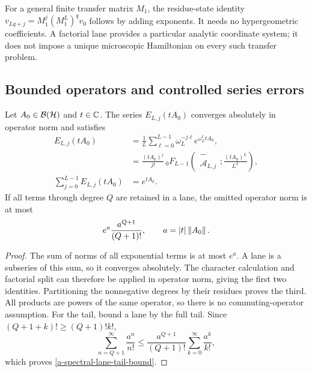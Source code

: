 For a general finite transfer matrix $M_1$, the residue-state identity
$v_{Lq+j}=M_1^j(M_1^L)^qv_0$ follows by adding exponents. It needs
no hypergeometric coefficients. A factorial lane provides a particular
analytic coordinate system; it does not impose a unique microscopic
Hamiltonian on every such transfer problem.

\subsection{Bounded operators and controlled series errors}

\begin{theorem}
\label{a-spectral-bounded-operator-lanes}
Let $A_0\in\mathcal B(\mathcal H)$ and $t\in\mathbb C$. The series
$E_{L,j}(tA_0)$ converges absolutely in operator norm and satisfies
\begin{align}
 E_{L,j}(tA_0)
 &=\frac1L\sum_{\ell=0}^{L-1}\omega_L^{-j\ell}
                           e^{\omega_L^\ell tA_0},\nonumber\\
 &=\frac{(tA_0)^j}{j!}\,
 {}_0F_{L-1}\!\left(\begin{matrix}-\\\mathcal A_{L,j}\end{matrix};
                      \frac{(tA_0)^L}{L^L}\right),\nonumber\\
 \sum_{j=0}^{L-1}E_{L,j}(tA_0)&=e^{tA_0}.
 \label{a-spectral-operator-lane-identities}
\end{align}
If all terms through degree $Q$ are retained in a lane, the omitted
operator norm is at most
\begin{equation}
 e^a\frac{a^{Q+1}}{(Q+1)!},\qquad a=|t|\left\lVert A_0\right\rVert.
 \label{a-spectral-lane-tail-bound}
\end{equation}
\end{theorem}
\begin{proof}
The sum of norms of all exponential terms is at most $e^a$. A lane
is a subseries of this sum, so it converges absolutely. The character
calculation and factorial split can therefore be applied in operator
norm, giving the first two identities. Partitioning the nonnegative
degrees by their residues proves the third. All products are powers
of the same operator, so there is no commuting-operator assumption.
For the tail, bound a lane by the full tail. Since
$(Q+1+k)!\geq(Q+1)!k!$,
\[
 \sum_{n=Q+1}^\infty\frac{a^n}{n!}
 \leq\frac{a^{Q+1}}{(Q+1)!}\sum_{k=0}^\infty\frac{a^k}{k!},
\]
which proves \eqref{a-spectral-lane-tail-bound}.
\end{proof}

